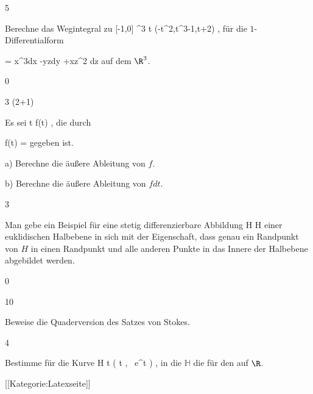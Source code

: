 {5}
{

Berechne das Wegintegral
\mathl{\int_\gamma \omega}{} zu
\maabbeledisp {\gamma} { [-1,0] } {\R^3
} { t } {(-t^2,t^3-1,t+2)
} {,}
für die $1$-Differentialform

\mavergleichskettedisp
{\vergleichskette
{ \omega
}
{ =} { x^3dx -yzdy +xz^2 dz
}
{ } {
}
{ } {
}
{ } {
}
}
{}{}{}
auf dem $\R^3$.

}
{} {}

{0}
{

}
{} {}

{3 (2+1)}
{

Es sei
 {\R} {\R
} { t } {f(t)
} {,}
die durch

\mavergleichskettedisp
{\vergleichskette
{ f(t)
}
{ =} { {  }
}
{ } {
}
{ } {
}
{ } {
}
}
{}{}{}
gegeben ist.

a) Berechne die äußere Ableitung von $f$.

b) Berechne die äußere Ableitung von $fdt$.

}
{} {}

{3}
{

Man gebe ein Beispiel für eine stetig differenzierbare Abbildung
\maabbdisp {\varphi} { H } { H
} {}
einer euklidischen Halbebene in sich mit der Eigenschaft, dass genau ein Randpunkt von $H$ in einen Randpunkt und alle anderen Punkte in das Innere der Halbebene abgebildet werden.

}
{} {}

{0}
{

}
{} {}

{10}
{

Beweise die Quaderversion des Satzes von Stokes.

}
{} {}

{4}
{

Bestimme für die Kurve
\maabbeledisp {\psi} {\R} { {\mathbb H}
} { t } { \left(  t   , \,  e^t                   \right)
} {,}
in die
${\mathbb H}$ die
für den
 {} {}
auf $\R$.

}
{} {}

 [[Kategorie:Latexseite]]
